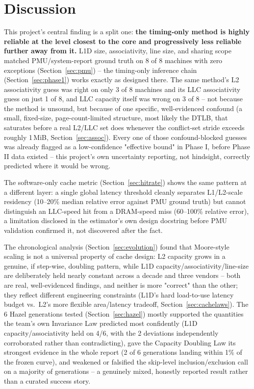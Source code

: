 \documentclass{article}
\begin{document}
\section{Discussion}

This project's central finding is a split one: \textbf{the timing-only method is highly
reliable at the level closest to the core and progressively less reliable further away from
it.} L1D size, associativity, line size, and sharing scope matched PMU/system-report ground
truth on 8 of 8 machines with zero exceptions (Section~\ref{sec:pmu}) -- the timing-only
inference chain (Section~\ref{sec:phase1}) works exactly as designed there. The same method's
L2 associativity guess was right on only 3 of 8 machines and its LLC associativity guess on
just 1 of 8, and LLC capacity itself was wrong on 3 of 8 -- not because the method is
unsound, but because of one specific, well-evidenced confound (a small, fixed-size,
page-count-limited structure, most likely the DTLB, that saturates before a real L2/LLC set
does whenever the conflict-set stride exceeds roughly 1\,MiB, Section~\ref{sec:assoc}).
Every one of those confound-blocked guesses was already flagged as a low-confidence
"effective bound" in Phase I, before Phase II data existed -- this project's own
uncertainty reporting, not hindsight, correctly predicted where it would be wrong.

The software-only cache metric (Section~\ref{sec:hitrate}) shows the same pattern at a
different layer: a single global latency threshold cleanly separates L1/L2-scale residency
(10--20\% median relative error against PMU ground truth) but cannot distinguish an
LLC-speed hit from a DRAM-speed miss (60--100\% relative error), a limitation disclosed in
the estimator's own design docstring before PMU validation confirmed it, not discovered
after the fact.

The chronological analysis (Section~\ref{sec:evolution}) found that Moore-style scaling is
not a universal property of cache design: L2 capacity grows in a genuine, if step-wise,
doubling pattern, while L1D capacity/associativity/line-size are deliberately held nearly
constant across a decade and three vendors -- both are real, well-evidenced findings, and
neither is more "correct" than the other; they reflect different engineering constraints
(L1D's hard load-to-use latency budget vs.\ L2's more flexible area/latency tradeoff,
Section~\ref{sec:cachelaws}). The 6 Hazel generations tested (Section~\ref{sec:hazel}) mostly
supported the quantities the team's own Invariance Law predicted most confidently (L1D
capacity/associativity held on 4/6, with the 2 deviations independently corroborated rather
than contradicting), gave the Capacity Doubling Law its strongest evidence in the whole
report (2 of 6 generations landing within 1\% of the frozen curve), and weakened or falsified
the skip-level inclusion/exclusion call on a majority of generations -- a genuinely mixed,
honestly reported result rather than a curated success story.
\end{document}
